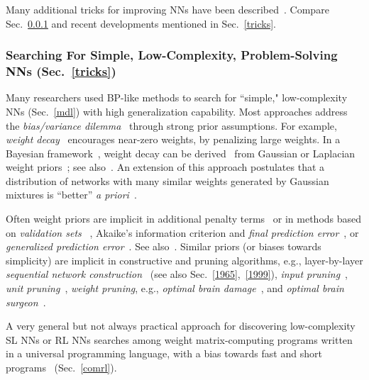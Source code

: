 \documentclass[letterpaper]{article}
\begin{document}
\begin{CJK*}{UTF8}{gbsn}
Many additional tricks for improving NNs have been described~\citep[e.g.,][]{orr1998neural,tricksofthetrade:2012}.
Compare Sec.~\ref{mdlnn} and recent developments mentioned in Sec.~\ref{tricks}. 

\subsubsection{Searching For Simple, Low-Complexity, Problem-Solving NNs (Sec.~\ref{tricks})}
\label{mdlnn}


Many researchers used BP-like methods to search for
``simple," low-complexity NNs (Sec.~\ref{mdl})
with high generalization capability. Most approaches 
address the {\em bias/variance dilemma}~\citep{Geman:92}
through strong prior 
assumptions. For example, 
{\em weight decay}~\citep{Hanson:89,Weigend:91,Krogh:92} 
encourages near-zero weights, by penalizing large weights. In a Bayesian
framework~\citep{bayes1763}, weight decay can be derived~\citep{Hinton:93} 
from Gaussian or Laplacian weight priors~\citep{gauss1809,laplace1774}; 
see also~\citep{Murray:93}. 
An extension of this approach
postulates that 
a distribution of networks
with many similar weights 
generated by Gaussian mixtures is ``better'' {\em a priori}~\citep{Nowlan:92}.

Often weight priors  are implicit in
additional penalty terms~\citep{MacKay:92b} or
 in methods based on {\em validation sets}
~\citep{Mosteller:68,Stone:74,Eubank:88,Hastie:90,Craven:79,Golub:79},
Akaike's information criterion and
 {\em final prediction error}~\citep{Akaike:70,akaike1973,akaike1974}, or
{\em generalized prediction error}~\citep{Moody:94a,Moody:92}.
See also~\citep{Holden:94,Wang:94,Amari:93,Wang:94,Vapnik:92a,Vapnik:92,Wolpert:94b}.
Similar priors (or biases towards simplicity) are implicit in  constructive and pruning algorithms,
e.g., layer-by-layer 
 {\em sequential network construction}~\citep[e.g.,][]{ivakhnenko1968,ivakhnenko1971,Ash:89,Moody:89,gallant1988,honavar1988,Ring:91,Fahlman:91,weng1992,honavar1993,burgess1994,fritzke94,parekh2000,utgoff2002} (see also Sec.~\ref{1965},~\ref{1999}),
{\em input pruning}~\citep{Moody:92,Refenes:94},
{\em unit pruning}~\citep[e.g.,][]{ivakhnenko1968,ivakhnenko1971,White:89,Mozer:89a,Levin:94},
{\em weight pruning}, e.g., {\em optimal brain damage}~\citep{LeCun:90a},
and {\em optimal brain surgeon}~\citep{Hassibi:93}. 

A very general but not always practical
approach for discovering low-complexity SL NNs or RL NNs searches among weight matrix-computing programs written in a universal programming language, with a bias
towards fast and short programs~\citep{Schmidhuber:97nn+} (Sec.~\ref{comrl}).


\end{CJK*}
\end{document}
